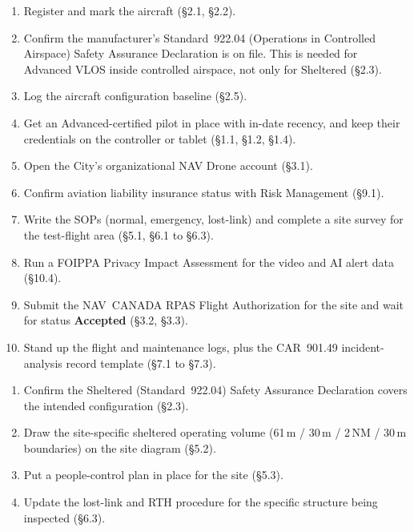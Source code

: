 \documentclass[11pt,letterpaper]{article}
\begin{document}
\begin{infobox}
\begin{enumerate}[leftmargin=1.6em, itemsep=2pt]
  \item Register and mark the aircraft (\S2.1, \S2.2).
  \item Confirm the manufacturer's Standard~922.04 (Operations in
        Controlled Airspace) Safety Assurance Declaration is on file.
        This is needed for Advanced VLOS inside controlled airspace,
        not only for Sheltered (\S2.3).
  \item Log the aircraft configuration baseline (\S2.5).
  \item Get an Advanced-certified pilot in place with in-date recency,
        and keep their credentials on the controller or tablet
        (\S1.1, \S1.2, \S1.4).
  \item Open the City's organizational NAV Drone account (\S3.1).
  \item Confirm aviation liability insurance status with Risk
        Management (\S9.1).
  \item Write the SOPs (normal, emergency, lost-link) and complete a
        site survey for the test-flight area (\S5.1, \S6.1 to \S6.3).
  \item Run a FOIPPA Privacy Impact Assessment for the video and AI
        alert data (\S10.4).
  \item Submit the NAV~CANADA RPAS Flight Authorization for the site
        and wait for status \textbf{Accepted} (\S3.2, \S3.3).
  \item Stand up the flight and maintenance logs, plus the CAR~901.49
        incident-analysis record template (\S7.1 to \S7.3).
\end{enumerate}
\end{infobox}

\begin{infobox}
\begin{enumerate}[leftmargin=1.6em, itemsep=2pt]
  \item Confirm the Sheltered (Standard~922.04) Safety Assurance
        Declaration covers the intended configuration (\S2.3).
  \item Draw the site-specific sheltered operating volume (61\,m /
        30\,m / 2\,NM / 30\,m boundaries) on the site diagram
        (\S5.2).
  \item Put a people-control plan in place for the site (\S5.3).
  \item Update the lost-link and RTH procedure for the specific
        structure being inspected (\S6.3).
\end{enumerate}
\end{infobox}
\end{document}
